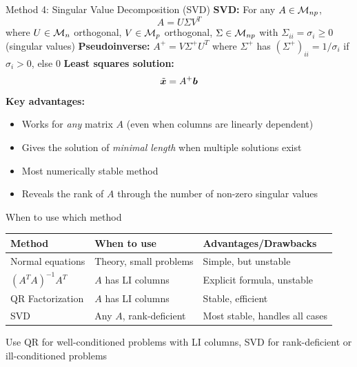 \documentclass[aspectratio=169]{beamer}\usepackage[]{graphicx}\usepackage[]{xcolor}
\begin{document}
\begin{frame}{Method 4: Singular Value Decomposition (SVD)}
\textbf{SVD:} For any $A\in\mathcal{M}_{np}$,
$$A = U\Sigma V^T$$
where $U\in\mathcal{M}_n$ orthogonal, $V\in\mathcal{M}_p$ orthogonal, $\Sigma\in\mathcal{M}_{np}$ with $\Sigma_{ii} = \sigma_i \geq 0$ (singular values)
\vfill
\textbf{Pseudoinverse:} $A^+ = V\Sigma^+ U^T$ where $\Sigma^+$ has $(\Sigma^+)_{ii} = 1/\sigma_i$ if $\sigma_i > 0$, else $0$
\vfill
\textbf{Least squares solution:}
$$\tilde{\bm{x}} = A^+\bm{b}$$
\vfill
\textbf{Key advantages:}
\begin{itemize}
\item Works for \emph{any} matrix $A$ (even when columns are linearly dependent)
\item Gives the solution of \emph{minimal length} when multiple solutions exist
\item Most numerically stable method
\item Reveals the rank of $A$ through the number of non-zero singular values
\end{itemize}
\end{frame}

\begin{frame}{When to use which method}
\begin{center}
\begin{tabular}{|l|l|l|}
\hline
\textbf{Method} & \textbf{When to use} & \textbf{Advantages/Drawbacks} \\
\hline
Normal equations & Theory, small problems & Simple, but unstable \\
\hline
$(A^TA)^{-1}A^T$ & $A$ has LI columns & Explicit formula, unstable \\
\hline
QR Factorization & $A$ has LI columns & Stable, efficient \\
\hline
SVD & Any $A$, rank-deficient & Most stable, handles all cases \\
\hline
\end{tabular}
\end{center}
\vfill
Use QR for well-conditioned problems with LI columns, SVD for rank-deficient or ill-conditioned problems
\end{frame}





\end{document}
